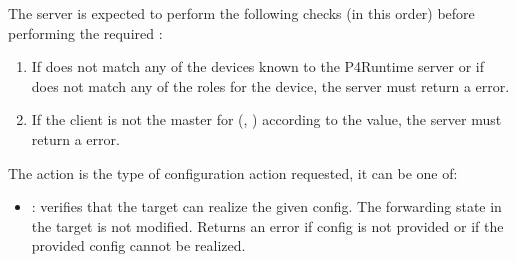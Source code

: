 \documentclass[11pt]{article}
\begin{document}
{%
\noindent{}The server is expected to perform the following checks (in this order)
before performing the required :%

\begin{enumerate}%

\item{}
If  does not match any of the devices known to the P4Runtime
server or if  does not match any of the roles for the device, the
server must return a  error.%

\item{}
If the client is not the master for (, ) according to the
 value, the server must return a  error.%
\end{enumerate}%

\noindent{}The action is the type of configuration action requested, it can be one of:%

\begin{itemize}%

\item{}
: verifies that the target can realize the given config. The
forwarding state in the target is not modified. Returns an 
error if config is not provided or if the provided config cannot be realized.%


\end{itemize}}
\end{document}

